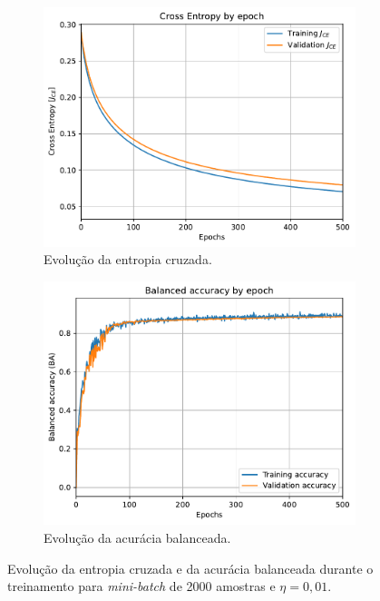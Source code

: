 \begin{figure}[H]
	\begin{subfigure}[H]{0.49\textwidth}
		\centering
		\includegraphics[width = \linewidth]{../../plot/LR_1/CE_500_epochs_batch_size2000}
		\caption{Evolução da entropia cruzada.}
		\label{fig:CE_500_epochs_batch_size2000}
	\end{subfigure}
	\begin{subfigure}[H]{0.49\textwidth}
		\centering
		\includegraphics[width = \linewidth]{../../plot/LR_1/BA_500_epochs_batch_size2000}
		\caption{Evolução da acurácia balanceada.}
		\label{fig:BA_500_epochs_batch_size2000}
	\end{subfigure}
	\caption{Evolução da entropia cruzada e da acurácia balanceada durante o treinamento para \textit{mini-batch} de 2000 amostras e $\eta = 0,01$.}
\end{figure}

